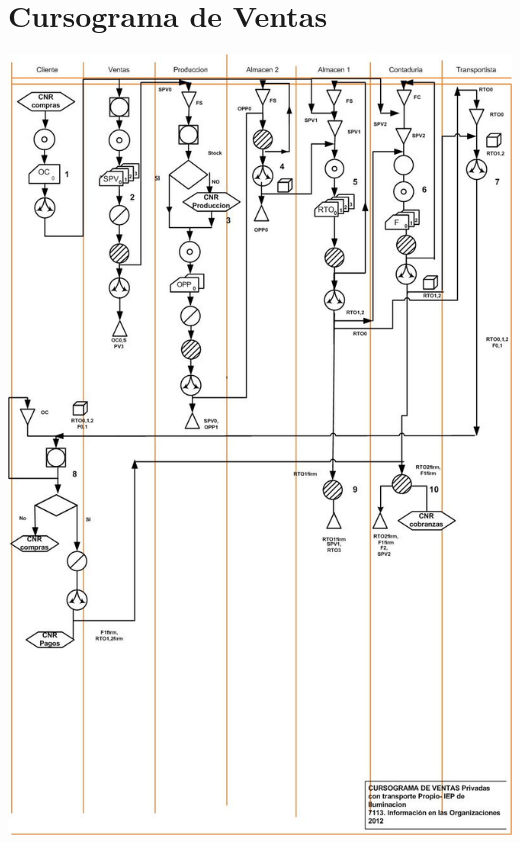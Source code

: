\pagebreak
\section{Cursograma de Ventas}
\begin{center}
 \includegraphics[scale=0.78,keepaspectratio=true]{Empresa/Circuitos/Ventas/Ventas-narrativa.jpg}
\end{center}

\pagebreak
